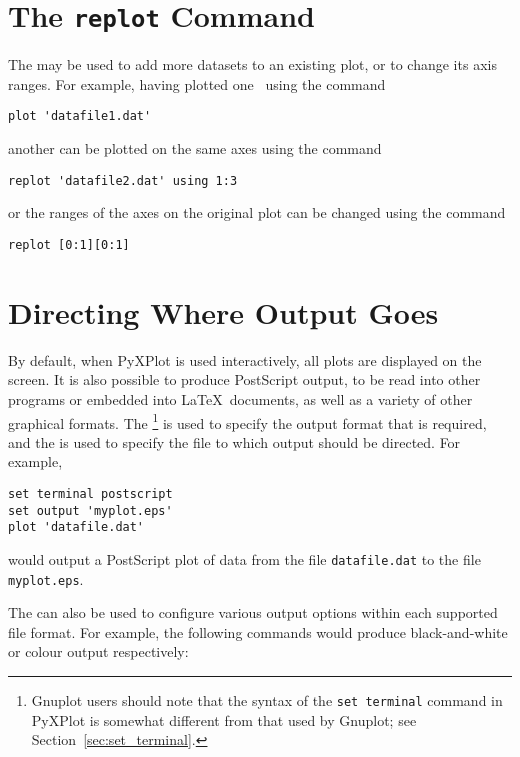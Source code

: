 \section{The {\tt replot} Command}
\label{sec:replot}

The  may be used to add more datasets to an existing plot, or
to change its axis ranges. For example, having plotted one \datafile\ using the
command

\begin{verbatim}
plot 'datafile1.dat'
\end{verbatim}

\noindent another can be plotted on the same axes using the command

\begin{verbatim}
replot 'datafile2.dat' using 1:3
\end{verbatim}

\noindent or the ranges of the axes on the original plot can be changed using
the command

\begin{verbatim}
replot [0:1][0:1]
\end{verbatim}

\section{Directing Where Output Goes}
\label{sec:directing_output}

By default, when PyXPlot is used interactively, all plots are displayed on the
screen. It is also possible to produce PostScript output, to be read into other
programs or embedded into \LaTeX\ documents, as well as a variety of other
graphical formats. The \footnote{Gnuplot users should
note that the syntax of the {\tt set terminal} command in PyXPlot is somewhat
different from that used by Gnuplot; see Section~\ref{sec:set_terminal}.} is
used to specify the output format that is required, and the  is used to specify the file to which output should be directed. For
example,

\begin{verbatim}
set terminal postscript
set output 'myplot.eps'
plot 'datafile.dat'
\end{verbatim}

\noindent would output a PostScript plot of data from the file {\tt datafile.dat} to the file
{\tt myplot.eps}.

The  can also be used to configure various output options
within each supported file format.  For example, the following commands would
produce black-and-white or colour output respectively:

